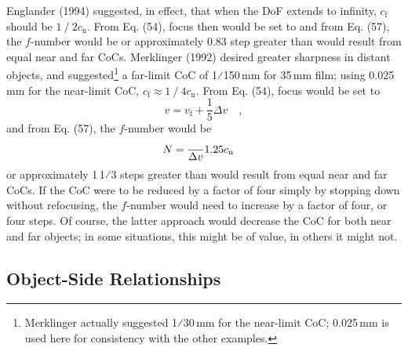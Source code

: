 \documentclass[11pt, oneside]{scrartcl}   	%
\newcommand{\Dv}{\ensuremath{\Delta v}}
\begin{document}
Englander (1994) suggested, in effect, that when the DoF extends to infinity, $c_\mathrm{f}$ should be $1⁄2 c_\mathrm{n}$. From Eq. (54), focus then would be set to
and from Eq. (57), the $f$-number would be
or approximately 0.83 step greater than would result from equal near
and far CoCs. Merklinger (1992) desired greater sharpness in distant
objects, and suggested\footnote{Merklinger actually suggested 1⁄30\,mm
  for the near-limit CoC; 0.025\,mm is used here for consistency with
  the other examples.} a far-limit CoC of 1⁄150\,mm for 35\,mm film;
using 0.025\,mm for the near-limit CoC, $c_\mathrm{f} \approx 1⁄4 c_\mathrm{n}$. From
Eq. (54), focus would be set to
\begin{equation}
  \label{eq:57+++}
  v=v_\mathrm{f}+\frac15\Dv\quad,
\end{equation}
and from Eq. (57), the $f$-number would be
\begin{equation}
  \label{eq:57++++}
  N=\frac \Dv{1.25c_\mathrm{n}}\quad
\end{equation}
or approximately 1\,1⁄3 steps greater than would result from equal near and far CoCs. If the CoC were to be reduced by a factor of four simply by stopping down without refocusing, the $f$-number would need to increase by a factor of four, or four steps. Of course, the latter approach would decrease the CoC for both near and far objects; in some situations, this might be of value, in others it might not.

\subsection{Object-Side Relationships}
\label{sec:object-side-relat}
\end{document}
